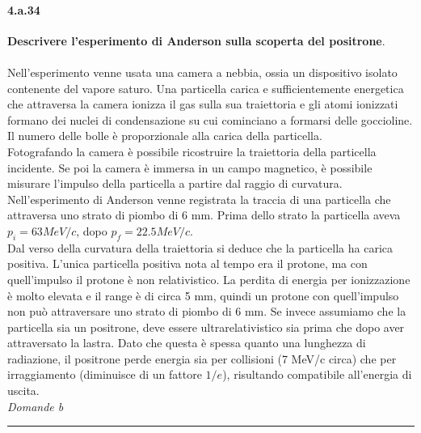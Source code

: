 \documentclass[twoside]{article}
\begin{document}
\paragraph{4.a.34}\textbf{Descrivere l’esperimento di Anderson sulla scoperta del positrone}.\\\\
Nell’esperimento venne usata una camera a nebbia, ossia un dispositivo isolato contenente del vapore saturo. Una particella carica e sufficientemente energetica che attraversa la camera ionizza il gas sulla sua traiettoria e gli atomi ionizzati formano dei nuclei di condensazione su cui cominciano a formarsi delle goccioline. Il numero delle bolle è proporzionale alla carica della particella.\\
Fotografando la camera è possibile ricostruire la traiettoria della particella incidente. Se poi la camera è immersa in un campo magnetico, è possibile misurare l’impulso della particella a partire dal raggio di curvatura.
Nell’esperimento di Anderson venne registrata la traccia di una particella che attraversa uno strato di piombo di 6 mm. Prima dello strato la particella aveva $p_i = 63 MeV/c$, dopo $p_f = 22.5 MeV/c$.\\
Dal verso della curvatura della traiettoria si deduce che la particella ha carica positiva. L’unica particella positiva nota al tempo era il protone, ma con quell’impulso il protone è non relativistico. La perdita di energia per ionizzazione è molto elevata e il range è di circa 5 mm, quindi un protone
con quell’impulso non può attraversare uno strato di piombo di 6 mm. Se invece assumiamo che la particella sia un positrone, deve essere ultrarelativistico sia prima che dopo aver attraversato la lastra. Dato che questa è spessa quanto una lunghezza di radiazione, il positrone perde energia sia per collisioni (7 MeV/c circa) che per irraggiamento (diminuisce di un fattore $1/e$), risultando compatibile all'energia di uscita.\\

\textit{Domande b}\rule{13.7 cm}{0.4pt}
\end{document}
